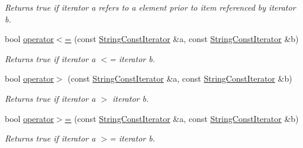 \begin{DoxyCompactItemize}
\begin{DoxyCompactList}\small\item\em Returns true if iterator a refers to a element prior to item referenced by iterator b. \end{DoxyCompactList}\item 
bool \hyperlink{struct_mdt_1_1_plain_text_1_1_string_const_iterator_a4873d7ea38532347f34f5972aa869d0d}{operator$<$=} (const \hyperlink{struct_mdt_1_1_plain_text_1_1_string_const_iterator}{String\+Const\+Iterator} \&a, const \hyperlink{struct_mdt_1_1_plain_text_1_1_string_const_iterator}{String\+Const\+Iterator} \&b)\hypertarget{struct_mdt_1_1_plain_text_1_1_string_const_iterator_a4873d7ea38532347f34f5972aa869d0d}{}\label{struct_mdt_1_1_plain_text_1_1_string_const_iterator_a4873d7ea38532347f34f5972aa869d0d}

\begin{DoxyCompactList}\small\item\em Returns true if iterator a $<$= iterator b. \end{DoxyCompactList}\item 
bool \hyperlink{struct_mdt_1_1_plain_text_1_1_string_const_iterator_a4ecb4b8bf38c6c9f73cab3376f30ddbc}{operator$>$} (const \hyperlink{struct_mdt_1_1_plain_text_1_1_string_const_iterator}{String\+Const\+Iterator} \&a, const \hyperlink{struct_mdt_1_1_plain_text_1_1_string_const_iterator}{String\+Const\+Iterator} \&b)\hypertarget{struct_mdt_1_1_plain_text_1_1_string_const_iterator_a4ecb4b8bf38c6c9f73cab3376f30ddbc}{}\label{struct_mdt_1_1_plain_text_1_1_string_const_iterator_a4ecb4b8bf38c6c9f73cab3376f30ddbc}

\begin{DoxyCompactList}\small\item\em Returns true if iterator a $>$ iterator b. \end{DoxyCompactList}\item 
bool \hyperlink{struct_mdt_1_1_plain_text_1_1_string_const_iterator_aa84a37a77a95607eb3d645a607e50831}{operator$>$=} (const \hyperlink{struct_mdt_1_1_plain_text_1_1_string_const_iterator}{String\+Const\+Iterator} \&a, const \hyperlink{struct_mdt_1_1_plain_text_1_1_string_const_iterator}{String\+Const\+Iterator} \&b)\hypertarget{struct_mdt_1_1_plain_text_1_1_string_const_iterator_aa84a37a77a95607eb3d645a607e50831}{}\label{struct_mdt_1_1_plain_text_1_1_string_const_iterator_aa84a37a77a95607eb3d645a607e50831}

\begin{DoxyCompactList}\small\item\em Returns true if iterator a $>$= iterator b. \end{DoxyCompactList}\end{DoxyCompactItemize}


